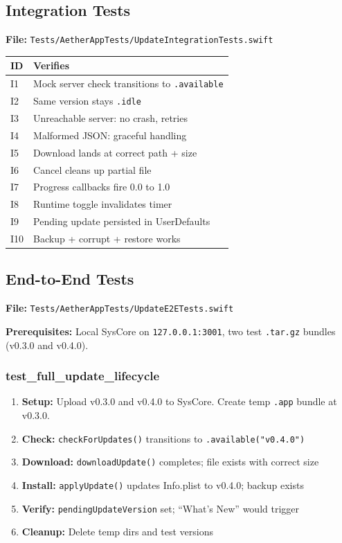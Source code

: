 \documentclass[11pt, a4paper]{article}
\begin{document}
\subsection{Integration Tests}

\textbf{File:} \texttt{Tests/AetherAppTests/UpdateIntegrationTests.swift}

\begin{tabularx}{\columnwidth}{lX}
\toprule
\textbf{ID} & \textbf{Verifies} \\
\midrule
I1 & Mock server check transitions to \texttt{.available} \\
I2 & Same version stays \texttt{.idle} \\
I3 & Unreachable server: no crash, retries \\
I4 & Malformed JSON: graceful handling \\
I5 & Download lands at correct path + size \\
I6 & Cancel cleans up partial file \\
I7 & Progress callbacks fire 0.0 to 1.0 \\
I8 & Runtime toggle invalidates timer \\
I9 & Pending update persisted in UserDefaults \\
I10 & Backup + corrupt + restore works \\
\bottomrule
\end{tabularx}

\subsection{End-to-End Tests}

\textbf{File:} \texttt{Tests/AetherAppTests/UpdateE2ETests.swift}

\textbf{Prerequisites:} Local SysCore on \texttt{127.0.0.1:3001}, two test \texttt{.tar.gz} bundles (v0.3.0 and v0.4.0).

\subsubsection{test\_full\_update\_lifecycle}

\begin{enumerate}[nosep, leftmargin=*]
  \item \textbf{Setup:} Upload v0.3.0 and v0.4.0 to SysCore. Create temp \texttt{.app} bundle at v0.3.0.
  \item \textbf{Check:} \texttt{checkForUpdates()} transitions to \texttt{.available("v0.4.0")}
  \item \textbf{Download:} \texttt{downloadUpdate()} completes; file exists with correct size
  \item \textbf{Install:} \texttt{applyUpdate()} updates Info.plist to v0.4.0; backup exists
  \item \textbf{Verify:} \texttt{pendingUpdateVersion} set; ``What's New'' would trigger
  \item \textbf{Cleanup:} Delete temp dirs and test versions
\end{enumerate}
\end{document}
